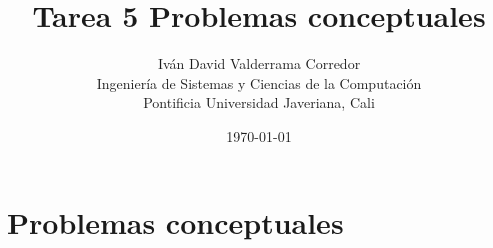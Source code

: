 \documentclass[a4paper,12pt]{article}
\title{Tarea 5 Problemas conceptuales}
\author{%
  Iván David Valderrama Corredor\\ %
  Ingeniería de Sistemas y Ciencias de la Computación\\ %
  Pontificia Universidad Javeriana, Cali}
\date{\today}
\newcommand{\subfigureautorefname}{\figureautorefname}
\begin{document}
	
\renewcommand{\tablename}{\bfseries Tabla} %
\renewcommand{\figurename}{\bfseries Figura} %
%
\maketitle

\tableofcontents

\newpage


\section{Problemas conceptuales}
\end{document}
